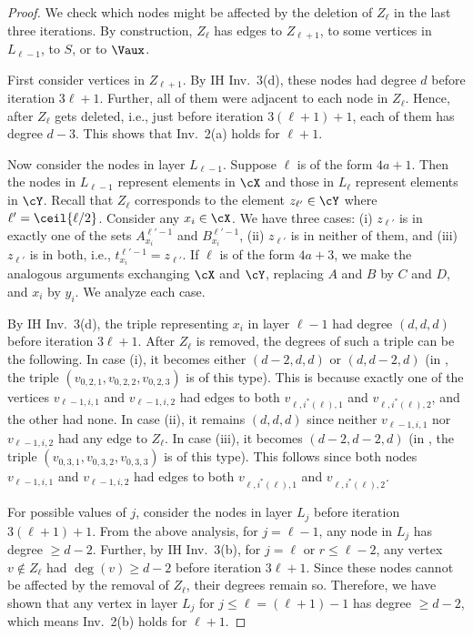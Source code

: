\begin{proof}
We check which nodes might be affected by the deletion of $Z_{\ell}$ in the last three iterations. By construction, $Z_{\ell}$ has edges to $Z_{\ell+1}$, to some vertices in $L_{\ell-1}$, to $S$, or to $\Vaux$. 

First consider vertices in $Z_{\ell+1}$. By IH Inv.~3(d), these nodes had degree $d$ before iteration $3\ell+1$. Further, all of them were adjacent to each node in $Z_\ell$. Hence, after $Z_{\ell}$ gets deleted, i.e., just before iteration $3(\ell+1)+1$, each of them has degree $d-3$. This shows that Inv.~2(a) holds for $\ell+1$. 

 Now consider the nodes in layer $L_{\ell-1}$. Suppose $\ell$ is of the form $4a+1$. Then the nodes in $L_{\ell-1}$ represent elements in $\cX$ and those in $L_\ell$ represent elements in $\cY$. Recall that $Z_{\ell}$ corresponds to the element $z_{\ell'}\in \cY$ where $\ell'=\ceil{\ell/2}$. Consider any $x_i\in \cX$. We have three cases: (i) $z_{\ell'}$ is in exactly one of the sets $A_{x_i}^{\ell'-1}$ and $B_{x_i}^{\ell'-1}$, (ii) $z_{\ell'}$ is in neither of them, and (iii) $z_{\ell'}$ is in both, i.e., $t_{x_i}^{\ell'-1}=z_{\ell'}$. If $\ell$ is of the form $4a+3$, we make the analogous arguments exchanging $\cX$ and $\cY$, replacing $A$ and $B$ by $C$ and $D$, and $x_i$ by $y_i$. We analyze each case.
 
 By IH Inv.~3(d), the triple representing $x_i$ in layer $\ell-1$ had degree $(d,d,d)$ before iteration $3\ell+1$. After $Z_{\ell}$ is removed, the degrees of such a triple can be the following. In case (i), it becomes either $(d-2,d,d)$ or $(d,d-2,d)$ (in , the triple $(v_{0,2,1}, v_{0,2,2}, v_{0,2,3})$ is of this type). This is because exactly one of the vertices $v_{\ell-1,i,1}$ and $v_{\ell-1,i,2}$ had edges to both $v_{\ell,i^*(\ell),1}$ and $v_{\ell,i^*(\ell),2}$, and the other had none. In case (ii), it remains $(d,d,d)$ since neither $v_{\ell-1,i,1}$ nor $v_{\ell-1,i,2}$ had any edge to $Z_{\ell}$. In case (iii), it becomes $(d-2,d-2,d)$ (in , the triple $(v_{0,3,1}, v_{0,3,2}, v_{0,3,3})$ is of this type). This follows since both nodes $v_{\ell-1,i,1}$ and $v_{\ell-1,i,2}$ had edges to both $v_{\ell,i^*(\ell),1}$ and $v_{\ell,i^*(\ell),2}$. 
 
 For possible values of $j$, consider the nodes in layer $L_j$ before iteration $3(\ell+1)+1$. From the above analysis, for $j=\ell-1$, any node in $L_j$ has degree $\geq d-2$. Further, by IH Inv.~3(b), for $j=\ell$ or $r\leq \ell-2$, any vertex $v\not\in Z_{\ell}$ had $\deg(v)\geq d-2$ before iteration $3\ell+1$. Since these nodes cannot be affected by the removal of $Z_{\ell}$, their degrees remain so. Therefore, we have shown that any vertex in layer $L_j$ for $j\leq \ell=(\ell+1)-1$ has degree $\geq d-2$, which means Inv.~2(b) holds for $\ell+1$. 


\end{proof}
